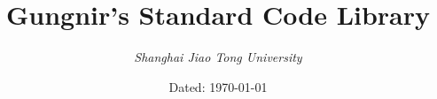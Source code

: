 \documentclass[landscape, oneside, a4paper, cs4size]{book}
\begin{document}
\scriptsize
	\title{\textbf{\LARGE{Gungnir's Standard Code Library}}}
	\author{\emph{Shanghai Jiao Tong University}}
	\date{Dated: \today}
	\maketitle
	\clearpage
	\begin{multicols}{2}
		\tableofcontents
		\clearpage
		\begin{spacing}{0.8}
			
		\end{spacing}
	\end{multicols}
\end{document}
